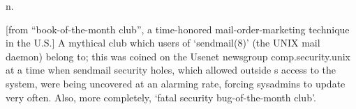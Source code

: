  n.

[from ``book-of-the-month club'', a time-honored mail-order-marketing technique
in the U.S.] A mythical club which users of `sendmail(8)' (the UNIX mail daemon)
belong to; this was coined on the Usenet newsgroup comp.security.unix at a time
when sendmail security holes, which allowed outside s access
to the system, were being uncovered at an alarming rate, forcing sysadmins to
update very often. Also, more completely, `fatal security bug-of-the-month
club'.

